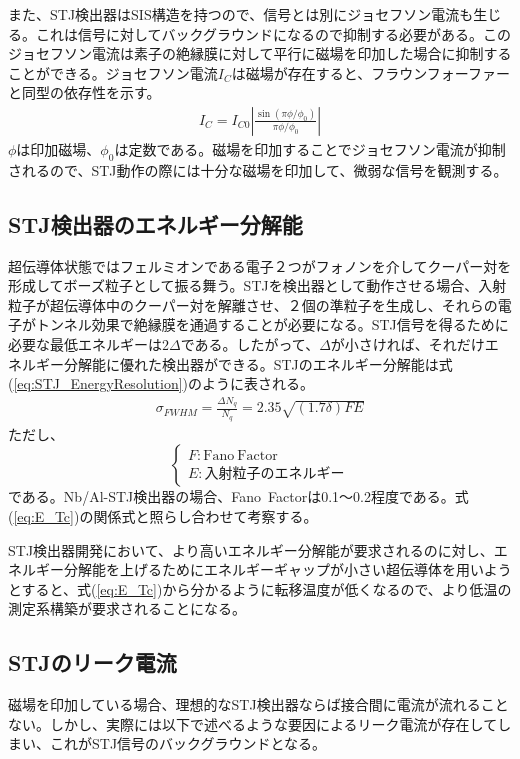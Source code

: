 		また、STJ検出器はSIS構造を持つので、信号とは別にジョセフソン電流も生じる。これは信号に対してバックグラウンドになるので抑制する必要がある。このジョセフソン電流は素子の絶縁膜に対して平行に磁場を印加した場合に抑制することができる。ジョセフソン電流$I_C$は磁場が存在すると、フラウンフォーファーと同型の依存性を示す。
		\begin{eqnarray}
			I_{C} = I_{C0} \left| \frac{\sin (\pi \phi / \phi_0)}{\pi \phi / \phi_0} \right|
		\end{eqnarray}
		$\phi$は印加磁場、$\phi_0$は定数である。磁場を印加することでジョセフソン電流が抑制されるので、STJ動作の際には十分な磁場を印加して、微弱な信号を観測する。
	
	\subsection{STJ検出器のエネルギー分解能}
		超伝導体状態ではフェルミオンである電子２つがフォノンを介してクーパー対を形成してボーズ粒子として振る舞う。STJを検出器として動作させる場合、入射粒子が超伝導体中のクーパー対を解離させ、２個の準粒子を生成し、それらの電子がトンネル効果で絶縁膜を通過することが必要になる。STJ信号を得るために必要な最低エネルギーは$2\Delta$である。したがって、$\Delta$が小さければ、それだけエネルギー分解能に優れた検出器ができる。STJのエネルギー分解能は式(\ref{eq:STJ_EnergyResolution})のように表される。
		\begin{eqnarray}
			\sigma_{FWHM} = \frac{\Delta N_q}{N_q} = 2.35 \sqrt{(1.7 \delta) FE}
			\label{eq:STJ_EnergyResolution}
		\end{eqnarray}
		ただし、
		\[
		\begin{cases}
			F : \mathrm{Fano\ Factor} \\
			E : \mathrm{入射粒子のエネルギー}
		\end{cases}
		\]
		である。Nb/Al-STJ検出器の場合、Fano\ Factorは0.1〜0.2程度である。式(\ref{eq:E_Tc})の関係式と照らし合わせて考察する。
		
		STJ検出器開発において、より高いエネルギー分解能が要求されるのに対し、エネルギー分解能を上げるためにエネルギーギャップが小さい超伝導体を用いようとすると、式(\ref{eq:E_Tc})から分かるように転移温度が低くなるので、より低温の測定系構築が要求されることになる。
		
	\subsection{STJのリーク電流}
		磁場を印加している場合、理想的なSTJ検出器ならば接合間に電流が流れることない。しかし、実際には以下で述べるような要因によるリーク電流が存在してしまい、これがSTJ信号のバックグラウンドとなる。
